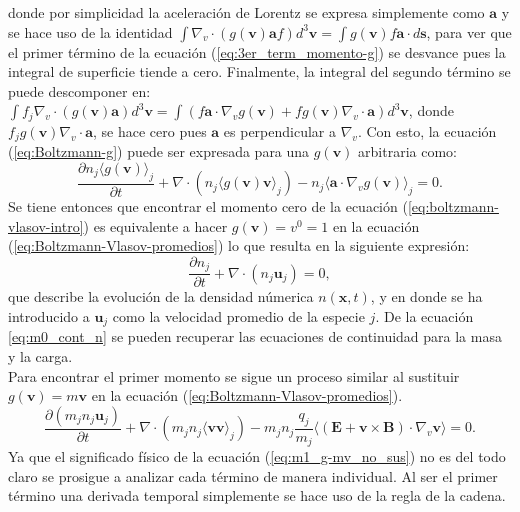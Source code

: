 \documentclass[../tesis_main_file.tex]{subfiles}
\begin{document}
donde por simplicidad la aceleración de Lorentz se expresa simplemente como $\textbf{a}$ y se hace uso de la identidad $\int \nabla_v\cdot (g(\textbf{v})\textbf{a}f)d^3\textbf{v}=\int g(\textbf{v})f\textbf{a}\cdot d\textbf{s}$, para ver que el primer término de la ecuación (\ref{eq:3er_term_momento-g}) se desvance pues la integral de superficie tiende a cero. 
Finalmente, la integral del segundo término se puede descomponer en: $\int f_j\nabla _v \cdot (g(\textbf{v})\textbf{a})d^3\textbf{v} = \int (f\textbf{a} \cdot \nabla_v g(\textbf{v}) + fg(\textbf{v})\nabla_v \cdot \textbf{a})d^3\textbf{v}$, donde $f_jg(\textbf{v})\nabla_v \cdot \textbf{a}$, se hace cero pues $\textbf{a}$ es perpendicular a $\nabla_v$. Con esto, la ecuación (\ref{eq:Boltzmann-g}) puede ser expresada para una $g(\textbf{v})$ arbitraria como:
    \begin{equation}
    \label{eq:Boltzmann-Vlasov-promedios}
    \frac{\partial n_j \langle g(\textbf{v}) \rangle_j}{\partial t}+\nabla \cdot (n_j \langle g(\textbf{v}) \textbf{v} \rangle_j)-n_j \langle \textbf{a}\cdot \nabla_v g(\textbf{v}) \rangle_j=0.
    \end{equation}
Se tiene entonces que encontrar el momento cero de la ecuación (\ref{eq:boltzmann-vlasov-intro}) es equivalente a hacer $g(\textbf{v})=v^0=1$ en la ecuación (\ref{eq:Boltzmann-Vlasov-promedios}) lo que resulta en la siguiente expresión:
\begin{equation}
\label{eq:m0_cont_n}
\frac{\partial n_j}{\partial t}+\nabla \cdot (n_j \textbf{u}_j)=0,
\end{equation}
que describe la evolución de la densidad númerica $n(\textbf{x},t)$, y en donde se ha introducido a $\textbf{u}_j$ como la velocidad promedio de la especie $j$. De la ecuación \ref{eq:m0_cont_n} se pueden recuperar las ecuaciones de continuidad para la masa y la carga.\\
Para encontrar el primer momento se sigue un proceso similar al sustituir $g(\textbf{v})=m\textbf{v}$ en la ecuación (\ref{eq:Boltzmann-Vlasov-promedios}).
\begin{equation}
\label{eq:m1_g-mv_no_sus}
\frac{\partial (m_jn_j\textbf{u}_j)}{\partial t}+\nabla \cdot (m_jn_j\langle \textbf{v}\textbf{v} \rangle_j)-m_jn_j\frac{q_j}{m_j}\langle (\textbf{E}+\textbf{v}\times \textbf{B})\cdot \nabla_v\textbf{v}\rangle=0.
\end{equation}
Ya que el significado físico de la ecuación (\ref{eq:m1_g-mv_no_sus}) no es del todo claro se prosigue a analizar cada término de manera individual.
Al ser el primer término una derivada temporal simplemente se hace uso de la regla de la cadena.
\end{document}

